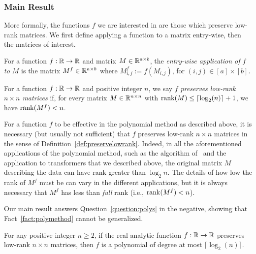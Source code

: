 \subsubsection{Main Result}

More formally, the functions $f$ we are interested in are those which preserve low-rank matrices. We first define applying a function to a matrix entry-wise, then the matrices of interest.
\begin{definition}
For a function $f : {\mathbb R} \to {\mathbb R}$ and matrix $M \in {\mathbb R}^{a \times b}$, the \emph{entry-wise application of $f$ to $M$} is the matrix $M^f \in {\mathbb R}^{a \times b}$ where $M^f_{i,j} := f(M_{i,j})$, for $(i,j) \in [a] \times [b]$.
\end{definition}

\begin{definition} \label{def:preservelowrank}
For a function $f : {\mathbb R} \to {\mathbb R}$ and positive integer $n$, we say $f$ \emph{preserves low-rank $n \times n$ matrices} if, for every matrix $M \in {\mathbb R}^{n \times n}$ with $\operatorname{rank}(M) \leq \lceil \log_2(n) \rceil + 1$, we have $\operatorname{rank}(M^f) < n$.
\end{definition}

For a function $f$ to be effective in the polynomial method as described above, it is necessary (but usually not sufficient) that $f$ preserves low-rank $n \times n$ matrices in the sense of Definition~\ref{def:preservelowrank}. Indeed, in all the aforementioned applications of the polynomial method, such as the algorithm of~\cite{acw16} and the application to transformers that we described above, the original matrix $M$ describing the data can have rank greater than $\log_2 n$. The details of how low the rank of $M^f$ must be can vary in the different applications, but it is always necessary that $M^f$ has less than \emph{full} rank (i.e., $\operatorname{rank}(M^f) < n$). 

Our main result answers Question~\ref{question:polys} in the negative, showing that Fact~\ref{fact:polymethod} cannot be generalized. 

\begin{theorem}\label{thm:log}
For any positive integer $n \geq 2$, if the real analytic function $f : {\mathbb R} \to {\mathbb R}$ preserves low-rank $n \times n$ matrices, then $f$ is a polynomial of degree at most $\lceil \log_2(n) \rceil$.
\end{theorem}

